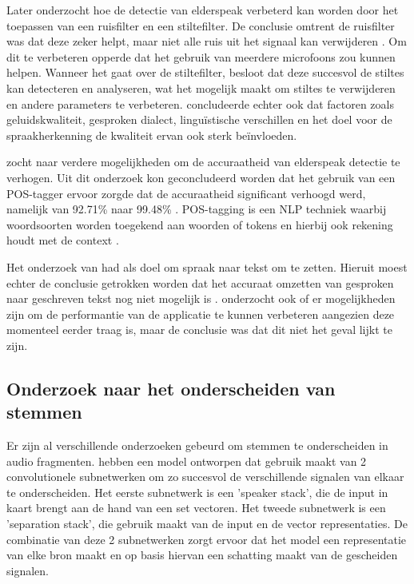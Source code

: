 Later onderzocht \textcite{Daems2023} hoe de detectie van elderspeak verbeterd kan worden door het toepassen van een ruisfilter en een stiltefilter. De conclusie omtrent de ruisfilter was dat deze zeker helpt, maar niet alle ruis uit het signaal kan verwijderen \autocite{Daems2023}. Om dit te verbeteren opperde \textcite{Daems2023} dat het gebruik van meerdere microfoons zou kunnen helpen.
Wanneer het gaat over de stiltefilter, besloot \textcite{Daems2023} dat deze succesvol de stiltes kan detecteren en analyseren, wat het mogelijk maakt om stiltes te verwijderen en andere parameters te verbeteren. \textcite{Daems2023} concludeerde echter ook dat factoren zoals geluidskwaliteit, gesproken dialect, linguïstische verschillen en het doel voor de spraakherkenning de kwaliteit ervan ook sterk beïnvloeden.

\textcite{Branden2024} zocht naar verdere mogelijkheden om de accuraatheid van elderspeak detectie te verhogen. Uit dit onderzoek kon geconcludeerd worden dat het gebruik van een POS-tagger ervoor zorgde dat de accuraatheid significant verhoogd werd, namelijk van 92.71\% naar 99.48\% \autocite{Branden2024}. POS-tagging is een NLP techniek waarbij woordsoorten worden toegekend aan woorden of tokens en hierbij ook rekening houdt met de context \autocite{Branden2024}.

Het onderzoek van \textcite{Schryver2024} had als doel om spraak naar tekst om te zetten. Hieruit moest echter de conclusie getrokken worden dat het accuraat omzetten van gesproken naar geschreven tekst nog niet mogelijk is \autocite{Schryver2024}. \textcite{Schryver2024} onderzocht ook of er mogelijkheden zijn om de performantie van de applicatie te kunnen verbeteren aangezien deze momenteel eerder traag is, maar de conclusie was dat dit niet het geval lijkt te zijn.

\subsection{Onderzoek naar het onderscheiden van stemmen}%

Er zijn al verschillende onderzoeken gebeurd om stemmen te onderscheiden in audio fragmenten. \textcite{Zeghidour2021} hebben een model ontworpen dat gebruik maakt van 2 convolutionele subnetwerken om zo succesvol de verschillende signalen van elkaar te onderscheiden. Het eerste subnetwerk is een 'speaker stack', die de input in kaart brengt aan de hand van een set vectoren. Het tweede subnetwerk is een 'separation stack', die gebruik maakt van de input en de vector representaties. De combinatie van deze 2 subnetwerken zorgt ervoor dat het model een representatie van elke bron maakt en op basis hiervan een schatting maakt van de gescheiden signalen. \autocite{Zeghidour2021}

